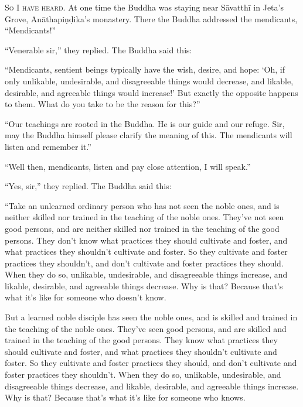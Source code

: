 \documentclass[12pt,openany]{book}%
\newcommand*{\scevam}[1]{\textsc{#1}}
\begin{document}
\scevam{So I have heard. }At one time the Buddha was staying near \textsanskrit{Sāvatthī} in Jeta’s Grove, \textsanskrit{Anāthapiṇḍika}’s monastery. There the Buddha addressed the mendicants, “Mendicants!” 

“Venerable sir,” they replied. The Buddha said this: 

“Mendicants, sentient beings typically have the wish, desire, and hope: ‘Oh, if only unlikable, undesirable, and disagreeable things would decrease, and likable, desirable, and agreeable things would increase!’ But exactly the opposite happens to them. What do you take to be the reason for this?” 

“Our teachings are rooted in the Buddha. He is our guide and our refuge. Sir, may the Buddha himself please clarify the meaning of this. The mendicants will listen and remember it.” 

“Well then, mendicants, listen and pay close attention, I will speak.” 

“Yes, sir,” they replied. The Buddha said this: 

“Take an unlearned ordinary person who has not seen the noble ones, and is neither skilled nor trained in the teaching of the noble ones. They’ve not seen good persons, and are neither skilled nor trained in the teaching of the good persons. They don’t know what practices they should cultivate and foster, and what practices they shouldn’t cultivate and foster. So they cultivate and foster practices they shouldn’t, and don’t cultivate and foster practices they should. When they do so, unlikable, undesirable, and disagreeable things increase, and likable, desirable, and agreeable things decrease. Why is that? Because that’s what it’s like for someone who doesn’t know. 

But a learned noble disciple has seen the noble ones, and is skilled and trained in the teaching of the noble ones. They’ve seen good persons, and are skilled and trained in the teaching of the good persons. They know what practices they should cultivate and foster, and what practices they shouldn’t cultivate and foster. So they cultivate and foster practices they should, and don’t cultivate and foster practices they shouldn’t. When they do so, unlikable, undesirable, and disagreeable things decrease, and likable, desirable, and agreeable things increase. Why is that? Because that’s what it’s like for someone who knows. 
\end{document}
